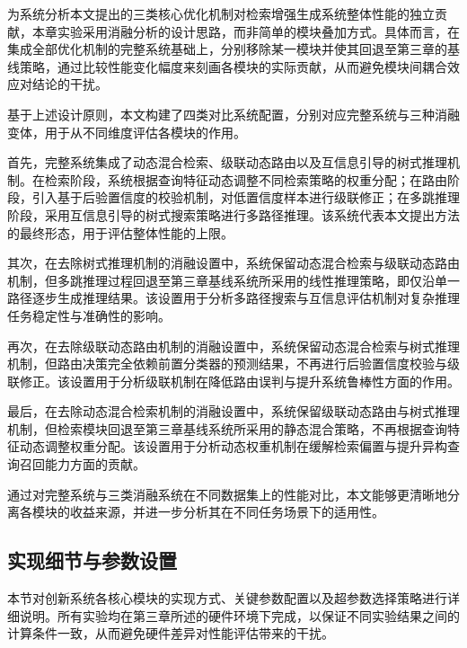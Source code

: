 为系统分析本文提出的三类核心优化机制对检索增强生成系统整体性能的独立贡献，本章实验采用消融分析的设计思路，而非简单的模块叠加方式。具体而言，在集成全部优化机制的完整系统基础上，分别移除某一模块并使其回退至第三章的基线策略，通过比较性能变化幅度来刻画各模块的实际贡献，从而避免模块间耦合效应对结论的干扰。

基于上述设计原则，本文构建了四类对比系统配置，分别对应完整系统与三种消融变体，用于从不同维度评估各模块的作用。

首先，完整系统集成了动态混合检索、级联动态路由以及互信息引导的树式推理机制。在检索阶段，系统根据查询特征动态调整不同检索策略的权重分配；在路由阶段，引入基于后验置信度的校验机制，对低置信度样本进行级联修正；在多跳推理阶段，采用互信息引导的树式搜索策略进行多路径推理。该系统代表本文提出方法的最终形态，用于评估整体性能的上限。


其次，在去除树式推理机制的消融设置中，系统保留动态混合检索与级联动态路由机制，但多跳推理过程回退至第三章基线系统所采用的线性推理策略，即仅沿单一路径逐步生成推理结果。该设置用于分析多路径搜索与互信息评估机制对复杂推理任务稳定性与准确性的影响。

再次，在去除级联动态路由机制的消融设置中，系统保留动态混合检索与树式推理机制，但路由决策完全依赖前置分类器的预测结果，不再进行后验置信度校验与级联修正。该设置用于分析级联机制在降低路由误判与提升系统鲁棒性方面的作用。

最后，在去除动态混合检索机制的消融设置中，系统保留级联动态路由与树式推理机制，但检索模块回退至第三章基线系统所采用的静态混合策略，不再根据查询特征动态调整权重分配。该设置用于分析动态权重机制在缓解检索偏置与提升异构查询召回能力方面的贡献。

通过对完整系统与三类消融系统在不同数据集上的性能对比，本文能够更清晰地分离各模块的收益来源，并进一步分析其在不同任务场景下的适用性。


\subsection{实现细节与参数设置}

本节对创新系统各核心模块的实现方式、关键参数配置以及超参数选择策略进行详细说明。所有实验均在第三章所述的硬件环境下完成，以保证不同实验结果之间的计算条件一致，从而避免硬件差异对性能评估带来的干扰。

